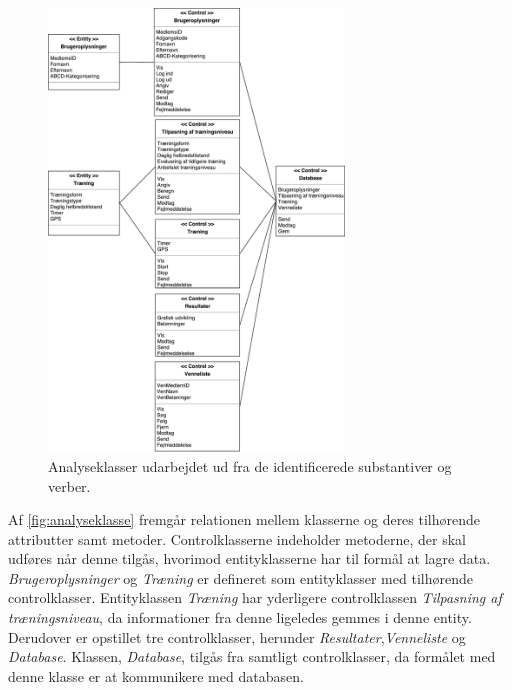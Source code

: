 \begin{figure}[H]
\centering
\includegraphics[width=0.7\textwidth]{figures/aktivitetsdiagram/analyseklasser}
\caption{Analyseklasser udarbejdet ud fra de identificerede substantiver og verber.}
\label{fig:analyseklasse}
\end{figure}

\noindent
Af \autoref{fig:analyseklasse} fremgår relationen mellem klasserne og deres tilhørende attributter samt metoder. Controlklasserne indeholder metoderne, der skal udføres når denne tilgås, hvorimod entityklasserne har til formål at lagre data. \textit{Brugeroplysninger} og \textit{Træning} er defineret som entityklasser med tilhørende controlklasser. Entityklassen \textit{Træning} har yderligere controlklassen \textit{Tilpasning af træningsniveau}, da informationer fra denne ligeledes gemmes i denne entity. Derudover er opstillet tre controlklasser, herunder \textit{Resultater},\textit{Venneliste} og \textit{Database}. Klassen, \textit{Database}, tilgås fra samtligt controlklasser, da formålet med denne klasse er at kommunikere med databasen. 